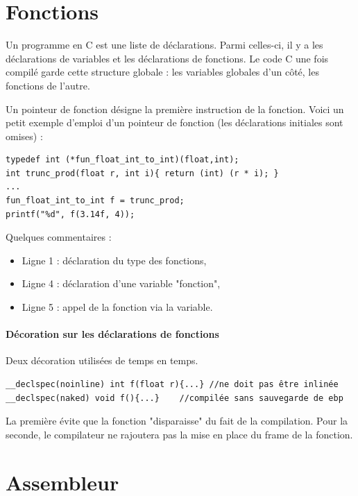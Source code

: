 \documentclass{book}
\begin{document}
\section{Fonctions}

Un programme en C est une liste de déclarations. Parmi celles-ci, il y a les déclarations de variables et les déclarations de fonctions. Le code C une fois compilé garde cette structure globale : les variables globales d'un côté, les fonctions de l'autre. 

Un pointeur de fonction désigne la première instruction de la fonction. Voici un petit exemple d'emploi d'un pointeur de fonction (les déclarations initiales sont omises) : 

\begin{verbatim}
typedef int (*fun_float_int_to_int)(float,int);
int trunc_prod(float r, int i){ return (int) (r * i); }
...
fun_float_int_to_int f = trunc_prod;
printf("%d", f(3.14f, 4));
\end{verbatim}

Quelques commentaires : 

\begin{itemize}
	\item Ligne 1 : déclaration du type des fonctions, 
	\item Ligne 4 : déclaration d'une variable "fonction",
	\item Ligne 5 : appel de la fonction via la variable. 
\end{itemize}

\paragraph{Décoration sur les déclarations de fonctions }

Deux décoration utilisées de temps en temps. 

\begin{verbatim}
__declspec(noinline) int f(float r){...} //ne doit pas être inlinée
__declspec(naked) void f(){...}    //compilée sans sauvegarde de ebp
\end{verbatim}

La première évite que la fonction "disparaisse" du fait de la compilation. Pour la seconde, le compilateur ne rajoutera pas la mise en place du frame de la fonction. 



\section{Assembleur}
\end{document}
